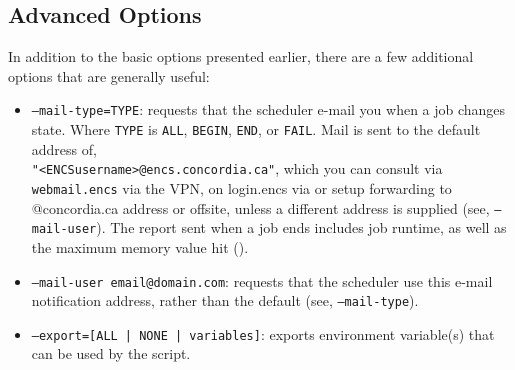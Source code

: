 \subsection{Advanced  Options}
\label{sect:submit-options}
\label{sect:qsub-options}

In addition to the basic  options presented earlier, there are a 
few additional options that are generally useful:

\begin{itemize}
\item
\texttt{--mail-type=TYPE}: requests that the scheduler e-mail you when a job changes
state. Where \texttt{TYPE} is \texttt{ALL}, \texttt{BEGIN}, \texttt{END}, or \texttt{FAIL}.
Mail is sent to the default address of, \\
\texttt{"<ENCSusername>@encs.concordia.ca"}, which you can consult
via \texttt{webmail.encs} via the VPN, on login.encs via 
or setup forwarding to @concordia.ca address or offsite,
unless a different address is supplied (see, \texttt{--mail-user}).
The report sent when a job ends includes job 
runtime, as well as the maximum memory value hit (). 

\item
\texttt{--mail-user email@domain.com}: requests that the scheduler use this e-mail 
notification address, rather than the default (see, \texttt{--mail-type}). 

\item
\texttt{--export=[ALL | NONE | variables]}: exports environment variable(s) that can be used by the script.


\end{itemize}
